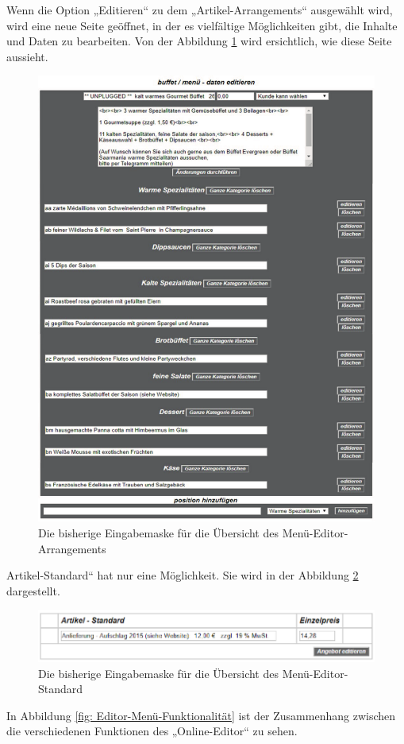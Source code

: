 Wenn die Option „Editieren“ zu dem „Artikel-Arrangements“ ausgewählt wird, wird eine neue Seite geöffnet, in der es vielfältige Möglichkeiten gibt, die Inhalte und Daten zu bearbeiten. Von der Abbildung \ref{fig: Editor-Menü2} wird ersichtlich, wie diese Seite aussieht.


\begin{figure}[h]
	\centering
	\includegraphics[width=0.7\linewidth]{Graphics/arrangement-Menue-editor.pdf}
		\caption[Kun2deansicht]{Die bisherige Eingabemaske für die Übersicht des Menü-Editor-Arrangements}
	\label{fig: Editor-Menü2}
\end{figure}


Artikel-Standard“ hat nur eine Möglichkeit. Sie wird in der Abbildung \ref{fig: Editor-Menü-Standard}   dargestellt.

\begin{figure}[h]
	\centering
	\includegraphics[width=0.7\linewidth]{Graphics/menuStandart.png}
	\caption[Kundeansicht]{Die bisherige Eingabemaske für die Übersicht des Menü-Editor-Standard}
	\label{fig: Editor-Menü-Standard}
\end{figure}

In Abbildung \ref{fig: Editor-Menü-Funktionalität} ist der Zusammenhang zwischen die verschiedenen Funktionen des „Online-Editor“ zu sehen.

